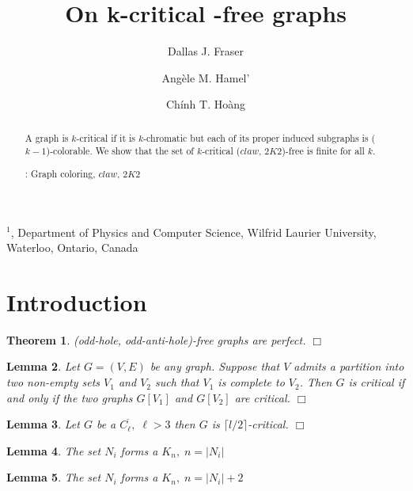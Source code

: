 \documentclass[12pt]{article}
\title{On k-critical {\CK}-free graphs}
\author{
	Dallas J. Fraser\inst{1}
	\and Ang\`ele M. Hamel'\inst{1}
	\and Ch\'inh T. Ho\`ang\inst{1}
}
\newtheorem{Theorem}{Theorem}[section]
\newtheorem{Lemma}[Theorem]{Lemma}
\def\inst#1{$^{#1}$}
\def\CK{($claw$, $2K2$)}
\begin{document}
\maketitle

\begin{center}
{\footnotesize

\inst{1}, Department of Physics and Computer Science, Wilfrid Laurier
University, \\Waterloo, Ontario, Canada}

\end{center}

\begin{abstract}
A graph is $k$-critical if it is $k$-chromatic but each of its proper induced subgraphs is ($k-1$)-colorable. We show that the set of $k$-critical {\CK}-free is finite for all $k$.

: Graph coloring, $claw$, $2K2$
\end{abstract}


\section{Introduction}\label{sec:intro}

\begin{Theorem}\label{thm:strong-perfect}
(odd-hole, odd-anti-hole)-free graphs are perfect. $\Box$
\end{Theorem}

\begin{Lemma}\label{lem:join-critical}{\rm \cite{DhaHam2014}}
Let $G=(V,E)$ be any graph.  Suppose that $V$ admits a partition into
two non-empty sets $V_1$ and $V_2$ such that $V_1$ is complete to
$V_2$.  Then $G$ is critical if and only if the two graphs $G[V_1]$
and $G[V_2]$ are critical. $\Box$
\end{Lemma}

\begin{Lemma}\label{lem:anti-hole-critical}
Let $G$ be a $\overline{C_\ell,}\; \ell >3$ then $G$ is $\lceil l/2 \rceil$-critical. $\Box$
\end{Lemma}

\begin{Lemma}\label{lem:c5-cliques}
The set $N_i$ forms a $K_{n},\; n = |N_i|$
\end{Lemma}

\begin{Lemma}\label{lem:c5-pockets}
The set $N_i$ forms a $K_{n},\; n = |N_i| + 2$
\end{Lemma}
\end{document}

